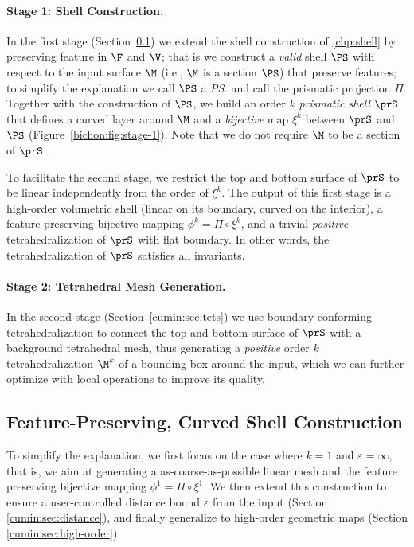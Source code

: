 \paragraph{Stage 1: Shell Construction.}
In the first stage (Section~\ref{cumin:sec:surface}) we extend the shell construction of \ref{chp:shell} by preserving feature in $\F$ and $\V$; that is we construct a \emph{valid} shell $\PS$ with respect to the input surface $\M$ (i.e., $\M$ is a section $\PS$) that preserve features; to simplify the explanation we call $\PS$ a \emph{\ps{}} and call the prismatic projection $\Pi$. Together with the construction of $\PS$, we build an order $k$ \emph{prismatic shell} $\prS$ that defines a curved layer around $\M$ and a \emph{bijective} map $\xi^k$ between $\prS$ and $\PS$ (Figure~\ref{bichon:fig:stage-1}). Note that we do not require $\M$ to be a section of $\prS$.

To facilitate the second stage, we restrict the top and bottom surface of $\prS$ to be linear independently from the order of $\xi^k$. The output of this first stage is a high-order volumetric shell (linear on its boundary, curved on the interior), a feature preserving bijective mapping $\phi^k = \Pi \circ \xi^k$, and a trivial \emph{positive} tetrahedralization of $\prS$ with flat boundary. In other words, the tetrahedralization of $\prS$ satisfies all invariants.

\paragraph{Stage 2: Tetrahedral Mesh Generation.}
In the second stage (Section~\ref{cumin:sec:tets}) we use boundary-conforming tetrahedralization to connect the top and bottom surface of $\prS$ with a background tetrahedral mesh, thus generating a \emph{positive} order $k$ tetrahedralization $\M^k$ of a bounding box around the input, which we can further optimize with local operations to improve its quality. %



\subsection{Feature-Preserving, Curved Shell Construction}\label{cumin:sec:surface}
To simplify the explanation, we first focus on the case where $k=1$ and $\varepsilon = \infty$, that is, we aim at generating a as-coarse-as-possible linear mesh and the feature preserving bijective mapping $\phi^1 = \Pi \circ \xi^1$. We then extend this construction to ensure a user-controlled distance bound $\varepsilon$ from the input (Section \ref{cumin:sec:distance}), and finally generalize to high-order geometric maps (Section \ref{cumin:sec:high-order}).

